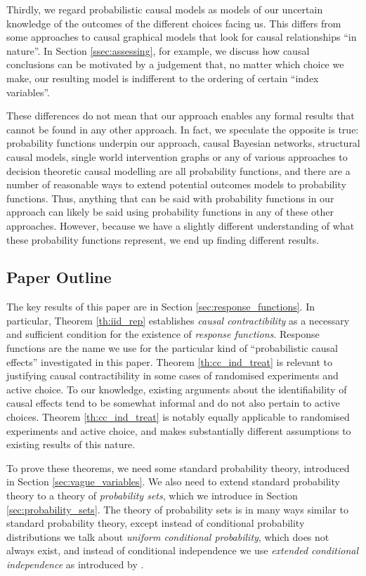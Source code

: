 \documentclass{article}
\theoremstyle{plain}
\theoremstyle{definition}
\begin{document}
Thirdly, we regard probabilistic causal models as models of our uncertain knowledge of the outcomes of the different choices facing us. This differs from some approaches to causal graphical models that look for causal relationships ``in nature''. In Section \ref{ssec:assessing}, for example, we discuss how causal conclusions can be motivated by a judgement that, no matter which choice we make, our resulting model is indifferent to the ordering of certain ``index variables''.

These differences do not mean that our approach enables any formal results that cannot be found in any other approach. In fact, we speculate the opposite is true: probability functions underpin our approach, causal Bayesian networks, structural causal models, single world intervention graphs or any of various approaches to decision theoretic causal modelling are all probability functions, and there are a number of reasonable ways to extend potential outcomes models to probability functions. Thus, anything that can be said with probability functions in our approach can likely be said using probability functions in any of these other approaches. However, because we have a slightly different understanding of what these probability functions represent, we end up finding different results.


\subsection{Paper Outline}

The key results of this paper are in Section \ref{sec:response_functions}. In particular, Theorem \ref{th:iid_rep} establishes \emph{causal contractibility} as a necessary and sufficient condition for the existence of \emph{response functions}. Response functions are the name we use for the particular kind of ``probabilistic causal effects'' investigated in this paper. Theorem \ref{th:cc_ind_treat} is relevant to justifying causal contractibility in some cases of randomised experiments and active choice. To our knowledge, existing arguments about the identifiability of causal effects tend to be somewhat informal and do not also pertain to active choices. Theorem \ref{th:cc_ind_treat} is notably equally applicable to randomised experiments and active choice, and makes substantially different assumptions to existing results of this nature.

To prove these theorems, we need some standard probability theory, introduced in Section \ref{sec:vague_variables}. We also need to extend standard probability theory to a theory of \emph{probability sets}, which we introduce in Section \ref{sec:probability_sets}. The theory of probability sets is in many ways similar to standard probability theory, except instead of conditional probability distributions we talk about \emph{uniform conditional probability}, which does not always exist, and instead of conditional independence we use \emph{extended conditional independence} as introduced by \citet{constantinou_extended_2017}.
\end{document}
